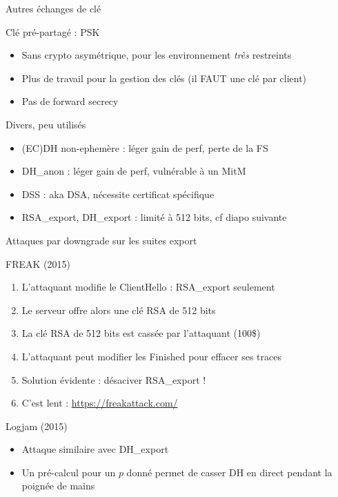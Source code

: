 \documentclass{mpg-ep-slides}
\begin{document}
\begin{frame}{Autres échanges de clé}
  \begin{block}{Clé pré-partagé : PSK}
    \begin{itemize}
      \item Sans crypto asymétrique, pour les environnement \emph{très}
        restreints
      \item Plus de travail pour la gestion des clés (il FAUT une clé par
        client)
      \item Pas de forward secrecy
    \end{itemize}
  \end{block}

  \begin{block}{Divers, peu utilisés}
    \begin{itemize}
      \item (EC)DH non-ephemère : léger gain de perf, perte de la FS
      \item DH_anon : léger gain de perf, vulnérable à un MitM
      \item DSS : aka DSA, nécessite certificat spécifique
      \item RSA_export, DH_export : limité à 512 bits, cf diapo suivante
    \end{itemize}
  \end{block}
\end{frame}

\begin{frame}{Attaques par downgrade sur les suites export}
  \begin{block}{FREAK (2015)}
    \begin{enumerate}
      \item L'attaquant modifie le ClientHello : RSA_export seulement
      \item Le serveur offre alors une clé RSA de 512 bits
      \item La clé RSA de 512 bits est cassée par l'attaquant (100\$)
      \item L'attaquant peut modifier les Finished pour effacer ses traces
      \item Solution évidente : désaciver RSA_export !
      \item C'est lent : \url{https://freakattack.com/}
    \end{enumerate}
  \end{block}

  \begin{block}{Logjam (2015)}
    \begin{itemize}
      \item Attaque similaire avec DH_export
      \item Un pré-calcul pour un $p$ donné permet de casser DH en direct
        pendant la poignée de mains
    \end{itemize}
  \end{block}
\end{frame}
\end{document}
